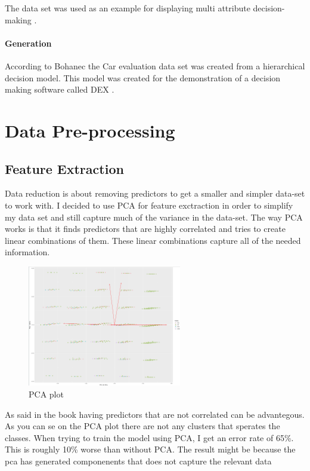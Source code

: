\documentclass[a4paper, 12pt]{article}
\begin{document}
The data set was used as an example for displaying multi attribute decision-making \cite{dataset-usage}.

\paragraph{Generation}
According to Bohanec the Car evaluation data set was created from a hierarchical decision model. This model was created for the demonstration of a decision making software called DEX \cite{dataset}.

\section{Data Pre-processing}
\subsection{Feature Extraction}
Data reduction is about removing predictors to get a smaller and simpler data-set to work with. I decided to use PCA for feature exctraction in order to simplify my data set and still capture much of the variance in the data-set. The way PCA works is that it finds predictors that are highly correlated and tries to create linear combinations of them. These linear combinations capture all of the needed information.

  \begin{figure}[h]
    \centering 
    \includegraphics[width=0.6\textwidth]
    {images/PCA-PLOT}
    \caption{PCA plot}
    \label{fig:pca}
  \end{figure}

  As said in the book \cite{modeling-book} having predictors that are not correlated can be advantegous. As you can se on the PCA plot there are not any clusters that sperates the classes.
When trying to train the model using PCA, I get an error rate of 65\%. This is roughly 10\% worse than without PCA. The result might be because the pca has generated componenents that does not capture the relevant data \cite{modeling-book}
\end{document}

